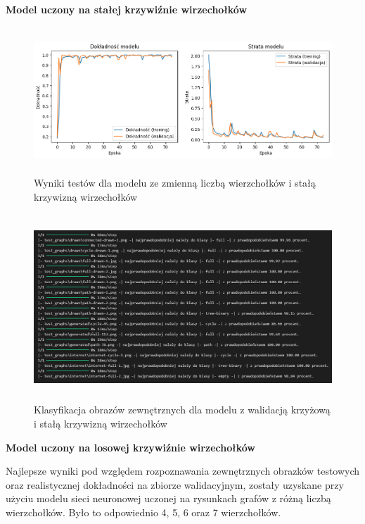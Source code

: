 \textbf{Model uczony na stałej krzywiźnie wirzechołków}

\begin{figure}[ht]
	\centering
	\includegraphics[height=5.5cm]{resources/tests/images/v2/multiple_edges_img.png}
	\caption{Wyniki testów dla modelu ze zmienną liczbą wierzchołków i stałą krzywizną wirzechołków}
	\label{Fig:tests-var-1}
\end{figure}
\FloatBarrier

\begin{figure}[ht]
	\centering
	\includegraphics[height=7cm]{resources/tests/images/v2/multiple_edges_txt.png}
	\caption{Klasyfikacja obrazów zewnętrznych dla modelu z walidacją krzyżową i stałą krzywizną wirzechołków}
	\label{Fig:tests-var-2}
\end{figure}
\FloatBarrier

\textbf{Model uczony na losowej krzywiźnie wirzechołków}

Najlepsze wyniki pod względem rozpoznawania zewnętrznych obrazków testowych
oraz realistycznej dokładności na zbiorze walidacyjnym,
zostały uzyskane przy użyciu modelu sieci neuronowej uczonej na rysunkach grafów z różną liczbą wierzchołków.
Było to odpowiednio 4, 5, 6 oraz 7 wierzchołków.

